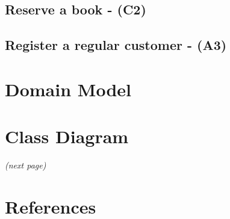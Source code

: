 \documentclass{article}
\begin{document}
% 

\newpage
\subsection{Reserve a book - (C2)}



\newpage
\subsection{Register a regular customer - (A3)}


\newpage
\section{Domain Model}


\newpage
\section{Class Diagram}
\textit{(next page)}


\newpage
\section{References}


\end{document}
